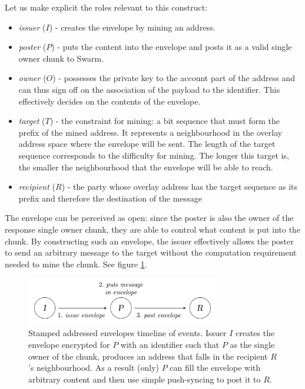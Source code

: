 Let us make explicit the roles relevant to this construct:

\begin{itemize}
\item \emph{issuer} ($I$) - creates the envelope by mining an address. 
\item \emph{poster} ($P$) - puts the content into the envelope and posts it as a valid single owner chunk to Swarm.
\item \emph{owner} ($O$) - possesses the private key to the account part of the address and can thus sign off on the association of the payload to the identifier. This effectively decides on the contents of the envelope.
\item \emph{target} ($T$) - the constraint for mining: a bit sequence that must form the prefix of the mined address. It represents a neighbourhood in the overlay address space where the envelope will be sent. The length of the target sequence corresponds to the difficulty for mining. The longer this target is, the smaller the neighbourhood that the envelope will be able to reach.
\item \emph{recipient} ($R$) - the party whose overlay address has the target sequence as its prefix and therefore the destination of the message
\end{itemize}

The envelope can be perceived as open: since the poster is also the owner of the response single owner chunk, they are able to control what content is put into the chunk. By constructing such an envelope, the issuer effectively allows the poster to send an arbitrary message to the target without the computation requirement needed to mine the chunk. See figure \ref{fig:addressed-envelope-events}. 


\begin{figure}[htbp]
   \centering
   \includegraphics[width=0.75\textwidth]{fig/prepaid-addressed-envelopes-events.pdf}
   \caption[Stamped addressed envelopes timeline of events \statusgreen]{Stamped addressed envelopes timeline of events. Issuer $I$ creates the envelope encrypted for $P$ with an identifier such that $P$ as the single owner of the chunk, produces an address that falls in the recipient $R$'s neighbourhood. As a result (only) $P$ can fill the envelope with arbitrary content and then use simple push-syncing to post it to $R$.}
   \label{fig:addressed-envelope-events}
\end{figure}

